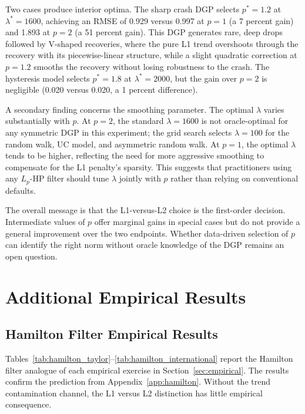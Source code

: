 \documentclass[10pt]{article}
\begin{document}
Two cases produce interior optima. The sharp crash DGP selects $p^* = 1.2$ at $\lambda^* = 1600$, achieving an RMSE of 0.929 versus 0.997 at $p = 1$ (a 7 percent gain) and 1.893 at $p = 2$ (a 51 percent gain). This DGP generates rare, deep drops followed by V-shaped recoveries, where the pure L1 trend overshoots through the recovery with its piecewise-linear structure, while a slight quadratic correction at $p = 1.2$ smooths the recovery without losing robustness to the crash. The hysteresis model selects $p^* = 1.8$ at $\lambda^* = 2000$, but the gain over $p = 2$ is negligible (0.020 versus 0.020, a 1 percent difference).

A secondary finding concerns the smoothing parameter. The optimal $\lambda$ varies substantially with $p$. At $p = 2$, the standard $\lambda = 1600$ is not oracle-optimal for any symmetric DGP in this experiment; the grid search selects $\lambda = 100$ for the random walk, UC model, and asymmetric random walk. At $p = 1$, the optimal $\lambda$ tends to be higher, reflecting the need for more aggressive smoothing to compensate for the L1 penalty's sparsity. This suggests that practitioners using any $L_p$-HP filter should tune $\lambda$ jointly with $p$ rather than relying on conventional defaults.

The overall message is that the L1-versus-L2 choice is the first-order decision. Intermediate values of $p$ offer marginal gains in special cases but do not provide a general improvement over the two endpoints. Whether data-driven selection of $p$ can identify the right norm without oracle knowledge of the DGP remains an open question.


\section{Additional Empirical Results}
\label{app:empirical_additional}

\subsection{Hamilton Filter Empirical Results}
\label{app:hamilton_empirical}

Tables~\ref{tab:hamilton_taylor}--\ref{tab:hamilton_international} report the Hamilton filter analogue of each empirical exercise in Section~\ref{sec:empirical}. The results confirm the prediction from Appendix~\ref{app:hamilton}. Without the trend contamination channel, the L1 versus L2 distinction has little empirical consequence.
\end{document}
